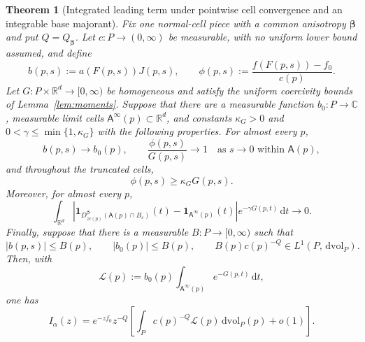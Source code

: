 \documentclass[11pt]{amsart}
\numberwithin{equation}{section}
\newtheorem{theorem}{Theorem}[section]
\theoremstyle{definition}
\theoremstyle{remark}
\newcommand{\R}{\mathbb{R}}
\newcommand{\C}{\mathbb{C}}
\newcommand{\ind}{\mathbf{1}}
\newcommand{\dd}{\,\mathrm{d}}
\newcommand{\dvol}{\,\mathrm{dvol}}
\newcommand{\eps}{\varepsilon}
\newcommand{\Afib}{\mathsf{A}}
\newcommand{\cL}{\mathcal{L}}
\begin{document}
\begin{theorem}[Integrated leading term under pointwise cell convergence and an integrable base majorant]
\label{thm:integrated-pointwise-cells}
Fix one normal-cell piece with a common anisotropy $\bm\beta$ and put
$Q=Q_{\bm\beta}$.  Let $c:P\to(0,\infty)$ be measurable, with no uniform lower
bound assumed, and define
\[
 b(p,s):=a(F(p,s))J(p,s),\qquad
 \phi(p,s):=\frac{f(F(p,s))-f_0}{c(p)}.
\]
Let $G:P\times\R^d\to[0,\infty)$ be homogeneous and satisfy the uniform
coercivity bounds of Lemma~\ref{lem:moments}.  Suppose that there are a
measurable function $b_0:P\to\C$, measurable limit cells
$\Afib^\infty(p)\subset\R^d$, and constants $\kappa_G>0$ and
$0<\gamma\le\min\{1,\kappa_G\}$ with the following properties.
For almost every $p$,
\begin{equation}\label{eq:pointwise-cell-local-limits}
 b(p,s)\longrightarrow b_0(p),\qquad
 \frac{\phi(p,s)}{G(p,s)}\longrightarrow1
 \quad\text{as }s\to0\text{ within }\Afib(p),
\end{equation}
and throughout the truncated cells,
\begin{equation}\label{eq:pointwise-cell-lower}
 \phi(p,s)\ge\kappa_G G(p,s).
\end{equation}
Moreover, for almost every $p$,
\begin{equation}\label{eq:pointwise-weighted-cell-limit}
 \int_{\R^d}
 \left|\ind_{D_{zc(p)}^{\bm\beta}(\Afib(p)\cap B_\eps)}(t)
       -\ind_{\Afib^\infty(p)}(t)\right|
 e^{-\gamma G(p,t)}\dd t\longrightarrow0.
\end{equation}
Finally, suppose that there is a measurable $B:P\to[0,\infty)$ such that
\begin{equation}\label{eq:pointwise-cell-majorant}
 |b(p,s)|\le B(p),\qquad |b_0(p)|\le B(p),\qquad
 B(p)c(p)^{-Q}\in L^1(P,\dvol_P).
\end{equation}
Then, with
\begin{equation}\label{eq:pointwise-cell-profile}
 \cL(p):=b_0(p)\int_{\Afib^\infty(p)}e^{-G(p,t)}\dd t,
\end{equation}
one has
\begin{equation}\label{eq:pointwise-cell-result}
 I_\alpha(z)=e^{-zf_0}z^{-Q}
 \left[\int_P c(p)^{-Q}\cL(p)\dvol_P(p)+o(1)\right].
\end{equation}
\end{theorem}
\end{document}
